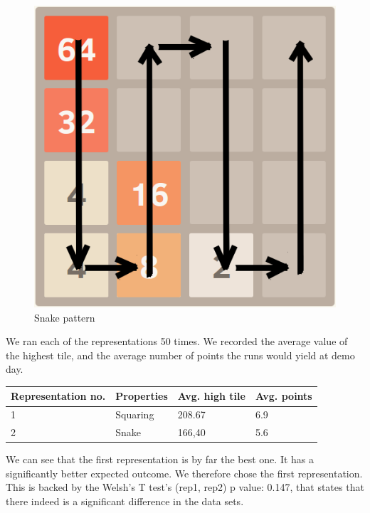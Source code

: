 \documentclass{article}
\begin{document}
\begin{figure}[H]
    \centering
    \includegraphics[scale=0.45]{images/path.png}
    \caption{Snake pattern}
    \label{fig:pattern}
\end{figure}

We ran each of the representations 50 times. We recorded the average value of the highest tile, and the average number of points the runs would yield at demo day. 

\begin{tabular}{|l|l|l|l|}
    \hline
    Representation no.   & Properties            & Avg. high tile     & Avg. points    \\\hline
    1                   & Squaring              &  208.67           & 6.9           \\\hline   
    2                   & Snake                 &  166,40           & 5.6           \\\hline    
\end{tabular}

We can see that the first representation is by far the best one. It has a significantly better expected outcome. We therefore chose the first representation. This is backed by the Welsh's T test's (rep1, rep2) p value: 0.147, that states that there indeed is a significant difference in the data sets.
\end{document}
